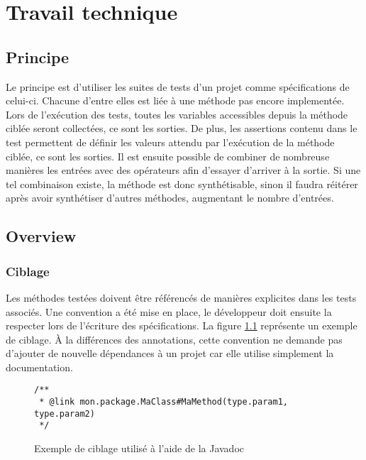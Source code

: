 

\chapter{Travail technique}
	\thispagestyle{document}
	
\section{Principe}
\label{sec:principe}

\par Le principe est d'utiliser les suites de tests d'un projet comme spécifications de celui-ci. Chacune d'entre elles est liée à une méthode pas encore implementée. Lors de l'exécution des tests, toutes les variables accessibles depuis la méthode ciblée seront collectées, ce sont les sorties. De plus, les assertions contenu dans le test permettent de définir les valeurs attendu par l'exécution de la méthode ciblée, ce sont les sorties. Il est ensuite possible de combiner de nombreuse manières les entrées avec des opérateurs afin d'essayer d'arriver à la sortie. Si une tel combinaison existe, la méthode est donc synthétisable, sinon il faudra réitérer après avoir synthétiser d'autres méthodes, augmentant le nombre d'entrées.


\section{Overview}
\label{sec:overview}

\subsection{Ciblage}
\label{subsec:ciblage}
\par Les méthodes testées doivent être référencés de manières explicites dans les tests associés. Une convention a été mise en place, le développeur doit ensuite la respecter lors de l'écriture des spécifications. La figure \ref{fig:ciblage} représente un exemple de ciblage. À la différences des annotations, cette convention ne demande pas d'ajouter de nouvelle dépendances à un projet car elle utilise simplement la documentation.

\begin{figure}[H]
\begin{lstlisting}
/**
 * @link mon.package.MaClass#MaMethod(type.param1, type.param2)
 */
\end{lstlisting}
\caption{Exemple de ciblage utilisé à l'aide de la Javadoc}
\label{fig:ciblage}
\end{figure}

